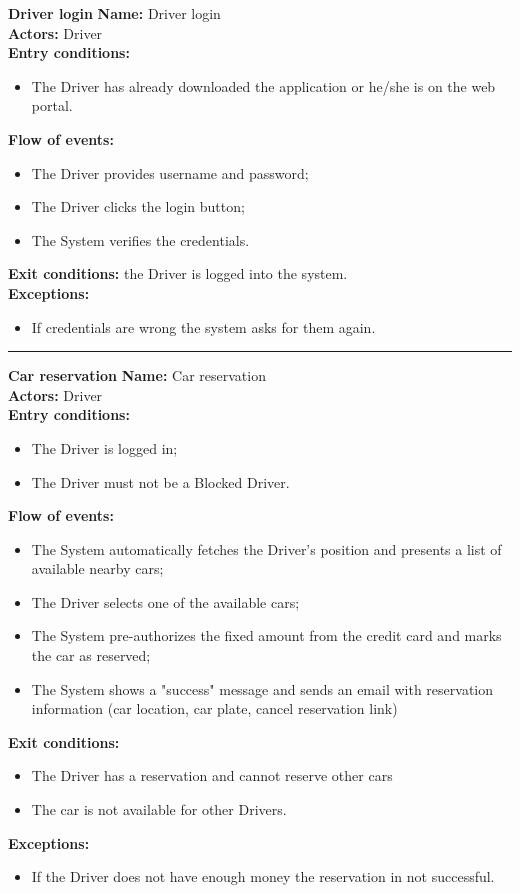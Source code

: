 \textbf{\large Driver login}
\bigbreak
\textbf{Name:} Driver login \\
\textbf{Actors:} Driver \\
\textbf{Entry conditions:} 
\begin{itemize}
\item The Driver has already downloaded the application or he/she is on the web portal.
\end{itemize}
\textbf{Flow of events:} 
\begin{itemize}
\item The Driver provides username and password;
\item The Driver clicks the login button;
\item The System verifies the credentials.
\end{itemize}
\textbf{Exit conditions:} the Driver is logged into the system.\\
\textbf{Exceptions:} 
\begin{itemize}
\item If credentials are wrong the system asks for them again.
\end{itemize}


\begin{center}
\noindent\rule{8cm}{1.0pt}
\end{center}


\textbf{\large Car reservation}
\bigbreak
\textbf{Name:} Car reservation \\
\textbf{Actors:} Driver \\
\textbf{Entry conditions:} 
\begin{itemize}
\item The Driver is logged in;
\item The Driver must not be a Blocked Driver.
\end{itemize}
\textbf{Flow of events:} 
\begin{itemize}
\item The System automatically fetches the Driver's position and presents a list of available nearby cars;
\item The Driver selects one of the available cars;
\item The System pre-authorizes the fixed amount from the credit card and marks the car as reserved;
\item The System shows a "success" message and sends an email with reservation information (car location, car plate, cancel reservation link)
\end{itemize}
\textbf{Exit conditions:} 
\begin{itemize}
\item The Driver has a reservation and cannot reserve other cars 
\item The car is not available for other Drivers.\\
\end{itemize}
\textbf{Exceptions:} 
\begin{itemize}
\item If the Driver does not have enough money the reservation in not successful.
\end{itemize}


